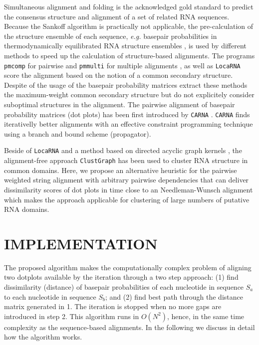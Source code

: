 \documentclass[a4paper,twoside]{article}
\newcommand\pmcomp{\texttt{pmcomp}}
\newcommand\pmmulti{\texttt{pmmulti}}
\newcommand\clustgraph{\texttt{ClustGraph}}
\newcommand\locarna{\texttt{LocaRNA}}
\newcommand\carna{\texttt{CARNA}}
\newcommand\eg{\textit{e.g.}}
\begin{document}
Simultaneous alignment and folding \cite{sankoff85} is the acknowledged gold
standard to predict the consensus structure and alignment of a set of related
RNA sequences. Because the Sankoff algorithm is practically not applicable, the
pre-calculation of the structure ensemble of each sequence, \eg{} basepair
probabilities in thermodynamically equilibrated RNA structure ensembles
\cite{McCaskill:1990}, is used by different methods to speed up the calculation
of structure-based alignments. The programs \pmcomp{} for pairwise and
\pmmulti{} for multiple alignments \cite{Hofacker15073017}, as well as
\locarna{} \cite{Will17432929} score the alignment based on the notion of a
common secondary structure. Despite of the usage of the basepair probability
matrices extract these methods the maximum-weight common secondary structure but
do not explicitely consider suboptimal structures in the alignment. The pairwise
alignment of basepair probability matrices (dot plots) has been first introduced
by \carna{} \cite{Palu2010,Sorescu2012}. \carna{} finds iterativelly better
alignments with an effective constraint programming technique using a branch and
bound scheme (propagator).

Beside of \locarna{} and a method based on directed acyclic graph kernels
\cite{Sato18647390}, the alignment-free approach \clustgraph{}
\cite{Heyne22689765} has been used to cluster RNA structure in common domains.
Here, we propose an alternative heuristic for the pairwise weighted string
alignment with arbitrary pairwise dependencies that can deliver dissimilarity
scores of dot plots in time close to an Needleman-Wunsch alignment which makes
the approach applicable for clustering of large numbers of putative RNA domains.


\section{\uppercase{Implementation}}

\noindent The proposed algorithm makes the computationally complex problem of
aligning two dotplots available by the iteration through a two step approach:
(1) find dissimilarity (distance) of basepair probabilities of each nucleotide
in sequence $S_a$ to each nucleotide in sequence $S_b$; and (2) find best path
through the distance matrix generated in 1. The iteration is stopped when no
more gaps are introduced in step 2. This algorithm runs in $O(N^2)$, hence, in
the same time complexity as the sequence-based alignments.  In the following we
discuss in detail how the algorithm works.
\end{document}

